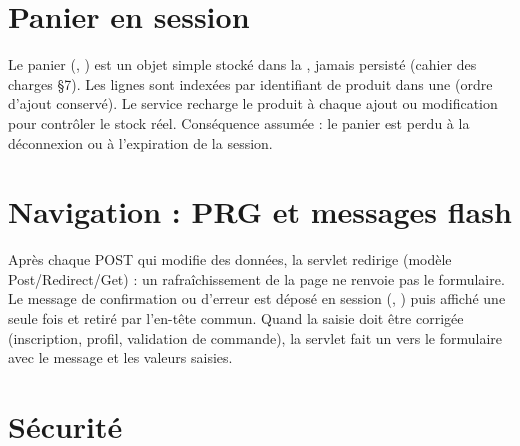 \section{Panier en session}

Le panier (, ) est un objet simple stocké dans la , jamais persisté
(cahier des charges §7). Les lignes sont indexées par identifiant de produit dans une  (ordre d'ajout
conservé). Le service recharge le produit à chaque ajout ou modification pour contrôler le stock réel.
Conséquence assumée : le panier est perdu à la déconnexion ou à l'expiration de la session.

\section{Navigation : PRG et messages flash}

Après chaque POST qui modifie des données, la servlet redirige (modèle Post/Redirect/Get) : un
rafraîchissement de la page ne renvoie pas le formulaire. Le message de confirmation ou d'erreur est déposé
en session (, ) puis affiché une seule fois et retiré par l'en-tête commun.
Quand la saisie doit être corrigée (inscription, profil, validation de commande), la servlet fait un
 vers le formulaire avec le message et les valeurs saisies.

\section{Sécurité}\label{sec:securite}

